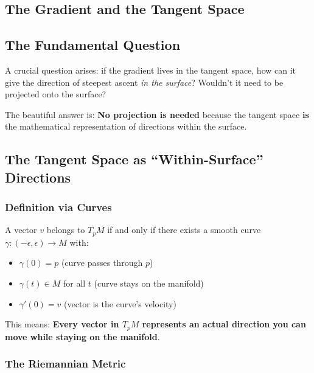 \begin{notechapter}
\chapter{The Gradient and the Tangent Space}\label{ch:gradient-tangent-space}

\section{The Fundamental Question}

A crucial question arises: if the gradient lives in the tangent space, how can it give the direction of steepest ascent \emph{in the surface}? Wouldn't it need to be projected onto the surface?

The beautiful answer is: \textbf{No projection is needed} because the tangent space \textbf{is} the mathematical representation of directions within the surface.

\section{The Tangent Space as ``Within-Surface'' Directions}

\subsection{Definition via Curves}

\begin{definition}
A vector $v$ belongs to $T_p M$ if and only if there exists a smooth curve $\gamma: (-\epsilon, \epsilon) \to M$ with:
\begin{itemize}
\item $\gamma(0) = p$ (curve passes through $p$)
\item $\gamma(t) \in M$ for all $t$ (curve stays on the manifold)  
\item $\gamma'(0) = v$ (vector is the curve's velocity)
\end{itemize}
\end{definition}

This means: \textbf{Every vector in $T_p M$ represents an actual direction you can move while staying on the manifold}.

\subsection{The Riemannian Metric}


\end{notechapter}
